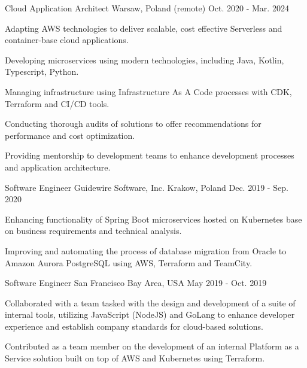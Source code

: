\begin{cventries}
  \cventry
    {Cloud Application Architect} %
    {} %
    {Warsaw, Poland (remote)} %
    {Oct. 2020 - Mar. 2024} %
    {
      \begin{cvitems} %
       \item {Adapting AWS technologies to deliver scalable, cost effective Serverless and container-base cloud applications.}
       \item {Developing microservices using modern technologies, including Java, Kotlin, Typescript, Python. }
       \item {Managing infrastructure using Infrastructure As A Code processes with CDK, Terraform and CI/CD tools.}
       \item {Conducting thorough audits of solutions to offer recommendations for performance and cost optimization.}
       \item {Providing mentorship to development teams to enhance development processes and application architecture.}
      \end{cvitems}
    }
\break
  \cventry
    {Software Engineer} %
    {Guidewire Software, Inc.} %
    {Krakow, Poland} %
    {Dec. 2019 - Sep. 2020} %
    {
      \begin{cvitems} %
       \item {Enhancing functionality of Spring Boot microservices hosted on Kubernetes base on business requirements and technical analysis.}
        \item {Improving and automating the process of database migration from Oracle to Amazon Aurora PostgreSQL using AWS, Terraform and TeamCity.}
      \end{cvitems}
    }

  \cventry
    {Software Engineer} %
    {} %
    {San Francisco Bay Area, USA} %
    {May 2019 - Oct. 2019} %
    {
      \begin{cvitems} %
        \item {Collaborated with a team tasked with the design and development of a suite of internal tools, utilizing JavaScript (NodeJS) and GoLang to enhance developer experience and establish company standards for cloud-based solutions.}
        \item {Contributed as a team member on the development of an internal Platform as a Service solution built on top of AWS and Kubernetes using Terraform. }
      \end{cvitems}
    }


\end{cventries}
